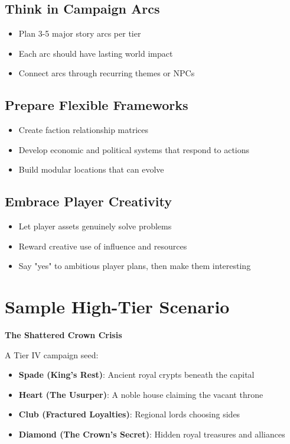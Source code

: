 \subsection*{Think in Campaign Arcs}

\begin{itemize}
    \item Plan 3-5 major story arcs per tier
    \item Each arc should have lasting world impact
    \item Connect arcs through recurring themes or NPCs
\end{itemize}

\subsection*{Prepare Flexible Frameworks}

\begin{itemize}
    \item Create faction relationship matrices
    \item Develop economic and political systems that respond to actions
    \item Build modular locations that can evolve
\end{itemize}

\subsection*{Embrace Player Creativity}

\begin{itemize}
    \item Let player assets genuinely solve problems
    \item Reward creative use of influence and resources
    \item Say "yes" to ambitious player plans, then make them interesting
\end{itemize}

\section{Sample High-Tier Scenario}

\textbf{The Shattered Crown Crisis}

A Tier IV campaign seed:
\begin{itemize}
    \item \textbf{Spade (King's Rest)}: Ancient royal crypts beneath the capital
    \item \textbf{Heart (The Usurper)}: A noble house claiming the vacant throne
    \item \textbf{Club (Fractured Loyalties)}: Regional lords choosing sides
    \item \textbf{Diamond (The Crown's Secret)}: Hidden royal treasures and alliances
\end{itemize}

